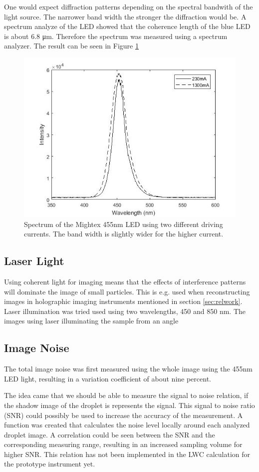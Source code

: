 One would expect diffraction patterns depending on the spectral bandwith of the light source. The narrower band width the stronger the diffraction would be. A spectrum analyze of the LED showed that the coherence length of the blue LED is about 6.8 μm. Therefore the spectrum was measured using a spectrum analyzer. The result can be seen in Figure \ref{fig:ledspectrum}

\begin{figure}%
\centering\includegraphics[width=0.6\linewidth]{figures/spektralanalys_mightex455nm}
\caption{Spectrum of the Mightex 455nm LED using two different driving currents. The band width is slightly wider for the higher current.}
\label{fig:ledspectrum}
\end{figure}

\subsection{Laser Light}

Using coherent light for imaging means that the effects of interference patterns will dominate the image of small particles. This is e.g. used when reconstructing images in holographic imaging instruments mentioned in section \ref{sec:relwork}. Laser illumination was tried used using two wavelengths, 450 and 850 nm. The images using laser illuminating the sample from an angle 

\subsection{Image Noise}

The total image noise was first measured using the whole image using the 455nm LED light, resulting in a variation coefficient of about nine percent.

The idea came that we should be able to measure the signal to noise relation, if the shadow image of the droplet is represents the signal. This signal to noise ratio (SNR) could possibly be used to increase the accuracy of the measurement. A function was created that calculates the noise level locally around each analyzed droplet image. A correlation could be seen between the SNR and the corresponding measuring range, resulting in an increased sampling volume for higher SNR. This relation has not been implemented in the LWC calculation for the prototype instrument yet.

